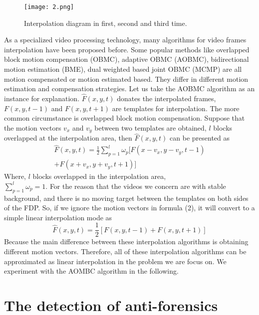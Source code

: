 \documentclass[pdftex,twocolumn,epjc3]{svjour3}          %
\begin{document}
\begin{figure}[!t]
 \texttt{[image: 2.png]}
 \caption{Interpolation diagram in first, second and third time.}\label{fig:2}
\end{figure}

As a specialized video processing technology, many algorithms for video frames interpolation have been proposed before.
Some popular methods like overlapped block motion compensation (OBMC), adaptive OBMC (AOBMC), bidirectional motion estimation (BME), dual weighted based joint OBMC (MCMP) are all motion compensated or motion estimated based. They differ in different motion estimation and compensation strategies. Let us take the AOBMC algorithm as an instance for explanation.
$\hat{F}(x, y, t)$ donates the interpolated frames, $F(x, y, t-1)$ and $F(x, y, t+1)$ are templates for interpolation. The more common circumstance is overlapped block motion compensation.
Suppose that the motion vectors $v_x$ and $v_y$ between two templates are obtained, $l$ blocks overlapped at the interpolation area, then $\hat{F}(x, y, t)$ can be presented as
\begin{multline}
\hat{F}(x, y, t)=\frac{1}{2}\sum_{p=1}^l \omega_p[F(x-v_x, y-v_y, t-1)\\
+F(x+v_x, y+v_y, t+1)]
\end{multline}
Where, $l$ blocks overlapped in the interpolation area,\\ $\sum_{p=1}^l \omega_{p}=1$. For the reason that the videos we concern are with stable background, and there is no moving target between the templates on both sides of the FDP. So, if we ignore the motion vectors in formula (2), it will convert to a simple linear interpolation mode as
\begin{equation}
\hat{F}(x, y, t)=\frac{1}{2}[F(x, y, t-1)+F(x, y, t+1)]
\end{equation}
Because the main difference between these interpolation algorithms is obtaining different motion vectors.
Therefore, all of these interpolation algorithms can be approximated as linear interpolation in the problem we are focus on. We experiment with the AOMBC algorithm in the following.

\section{The detection of anti-forensics}
\label{sec:Thedetection}
\end{document}
